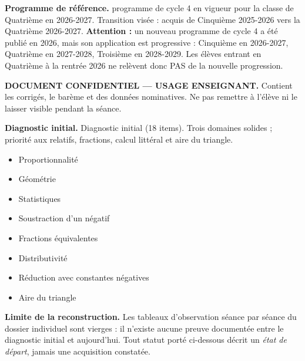 \documentclass[10pt,a4paper]{article}
\begin{document}
\begin{methodbox}\small\textbf{Programme de référence.} programme de cycle 4 en vigueur pour la classe de Quatrième en 2026-2027. Transition visée : acquis de Cinquième 2025-2026 vers la Quatrième 2026-2027. \textbf{Attention :} un nouveau programme de cycle 4 a été publié en 2026, mais son application est progressive : Cinquième en 2026-2027, Quatrième en 2027-2028, Troisième en 2028-2029. Les élèves entrant en Quatrième à la rentrée 2026 ne relèvent donc PAS de la nouvelle progression.\end{methodbox}
\begin{keybox}\textbf{DOCUMENT CONFIDENTIEL --- USAGE ENSEIGNANT.} Contient les corrigés, le barème et des données nominatives. Ne pas remettre à l'élève ni le laisser visible pendant la séance.\end{keybox}
\begin{methodbox}
\textbf{Diagnostic initial.} Diagnostic initial (18 items). Trois domaines solides ; priorité aux relatifs, fractions, calcul littéral et aire du triangle.
\end{methodbox}
\begin{itemize}\item Proportionnalité\item Géométrie\item Statistiques\end{itemize}
\begin{itemize}\item Soustraction d'un négatif\item Fractions équivalentes\item Distributivité\item Réduction avec constantes négatives\item Aire du triangle\end{itemize}
\begin{warningbox}\textbf{Limite de la reconstruction.} Les tableaux d'observation séance par séance du dossier individuel sont vierges : il n'existe aucune preuve documentée entre le diagnostic initial et aujourd'hui. Tout statut porté ci-dessous décrit un \emph{état de départ}, jamais une acquisition constatée.\end{warningbox}
\newpage{}
\end{document}
